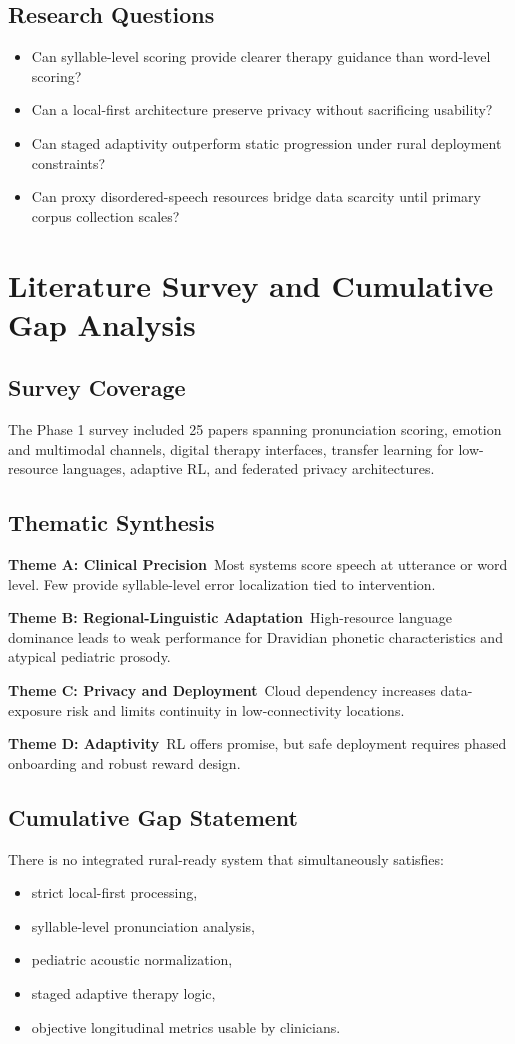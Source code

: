 \documentclass[12pt,a4paper]{article}
\begin{document}
\subsection{Research Questions}
\begin{itemize}[noitemsep,topsep=2pt]
\item Can syllable-level scoring provide clearer therapy guidance than word-level scoring?
\item Can a local-first architecture preserve privacy without sacrificing usability?
\item Can staged adaptivity outperform static progression under rural deployment constraints?
\item Can proxy disordered-speech resources bridge data scarcity until primary corpus collection scales?
\end{itemize}

\section{Literature Survey and Cumulative Gap Analysis}
\subsection{Survey Coverage}
The Phase 1 survey included 25 papers spanning pronunciation scoring, emotion and multimodal channels, digital therapy interfaces, transfer learning for low-resource languages, adaptive RL, and federated privacy architectures.

\subsection{Thematic Synthesis}
\textbf{Theme A: Clinical Precision}\
Most systems score speech at utterance or word level. Few provide syllable-level error localization tied to intervention.

\textbf{Theme B: Regional-Linguistic Adaptation}\
High-resource language dominance leads to weak performance for Dravidian phonetic characteristics and atypical pediatric prosody.

\textbf{Theme C: Privacy and Deployment}\
Cloud dependency increases data-exposure risk and limits continuity in low-connectivity locations.

\textbf{Theme D: Adaptivity}\
RL offers promise, but safe deployment requires phased onboarding and robust reward design.

\subsection{Cumulative Gap Statement}
There is no integrated rural-ready system that simultaneously satisfies:
\begin{itemize}[noitemsep,topsep=2pt]
\item strict local-first processing,
\item syllable-level pronunciation analysis,
\item pediatric acoustic normalization,
\item staged adaptive therapy logic,
\item objective longitudinal metrics usable by clinicians.
\end{itemize}
\end{document}
